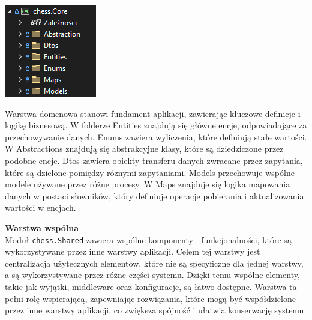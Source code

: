 \documentclass[12pt,a4paper]{article}
\begin{document}
\vspace{0.5cm}
\begin{minipage}[t]{0.45\textwidth}
    \vspace{0pt}
    \centering
    \includegraphics[width=\linewidth]{images/struktura_back_core.png} 
\end{minipage}
\hfill
\begin{minipage}[t]{0.45\textwidth}
    \vspace{0pt}
    \justifying 
    \noindent
    Warstwa domenowa stanowi fundament aplikacji, zawierając kluczowe definicje i logikę biznesową. W folderze Entities znajdują się główne encje, odpowiadające za przechowywanie danych. Enums zawiera wyliczenia, które definiują stałe wartości. W Abstractions znajdują się abstrakcyjne klasy, które są dziedziczone przez podobne encje. Dtos zawiera obiekty transferu danych zwracane przez zapytania, które są dzielone pomiędzy różnymi zapytaniami. Models przechowuje wspólne modele używane przez różne procesy. W Maps znajduje się logika mapowania danych w postaci słowników, który definiuje operacje pobierania i aktualizowania wartości w encjach.
\end{minipage}

\newpage

\noindent \textbf{Warstwa wspólna}\\
Moduł \texttt{chess.Shared} zawiera wspólne komponenty i funkcjonalności, które są wykorzystywane przez inne warstwy aplikacji. Celem tej warstwy jest centralizacja użytecznych elementów, które nie są specyficzne dla jednej warstwy, a są wykorzystywane przez różne części systemu. Dzięki temu wspólne elementy, takie jak wyjątki, middleware oraz konfiguracje, są łatwo dostępne. Warstwa ta pełni rolę wspierającą, zapewniając rozwiązania, które mogą być współdzielone przez inne warstwy aplikacji, co zwiększa spójność i ułatwia konserwację systemu.
\end{document}
